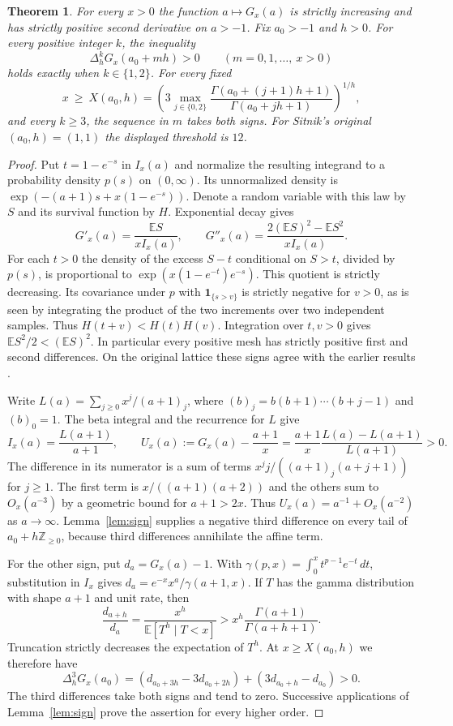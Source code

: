 \documentclass[11pt,a4paper]{article}
\newtheorem{theorem}{Theorem}[section]
\begin{document}
\begin{theorem}\label{thm:classification}
For every $x>0$ the function $a\mapsto G_x(a)$ is strictly increasing and
has strictly positive second derivative on $a>-1$. Fix $a_0>-1$ and $h>0$.
For every positive integer $k$, the inequality
\[
 \Delta_h^kG_x(a_0+mh)>0
 \qquad (m=0,1,\ldots,\ x>0)
\]
holds exactly when $k\in\{1,2\}$. For every fixed
\[
 x\ \ge\ X(a_0,h)=
 \left(3\max_{j\in\{0,2\}}
 \frac{\Gamma(a_0+(j+1)h+1)}{\Gamma(a_0+jh+1)}\right)^{1/h},
\]
and every $k\ge3$, the sequence in $m$ takes both signs.
For Sitnik's original $(a_0,h)=(1,1)$ the displayed threshold is $12$.
\end{theorem}
\begin{proof}
Put $t=1-e^{-s}$ in $I_x(a)$ and normalize the resulting integrand to a
probability density $p(s)$ on $(0,\infty)$. Its unnormalized density is
$\exp(-(a+1)s+x(1-e^{-s}))$. Denote a random variable with this law by
$S$ and its survival function by $H$. Exponential decay gives
\[
 G'_x(a)=\frac{\mathbb E S}{xI_x(a)},\qquad
 G''_x(a)=\frac{2(\mathbb E S)^2-\mathbb E S^2}{xI_x(a)}.
\]
For each $t>0$ the density of the excess $S-t$ conditional on $S>t$,
divided by $p(s)$, is proportional to $\exp(x(1-e^{-t})e^{-s})$.
This quotient is strictly decreasing. Its covariance under $p$ with
$\mathbf 1_{\{s>v\}}$ is strictly negative for $v>0$, as is seen by
integrating the product of the two increments over two independent samples.
Thus $H(t+v)<H(t)H(v)$. Integration over $t,v>0$ gives
$\mathbb E S^2/2<(\mathbb E S)^2$. In particular every positive mesh has
strictly positive first and second differences. On the original lattice these
signs agree with the earlier results \cite{sitnik,mehrez}.

Write $L(a)=\sum_{j\ge0}x^j/(a+1)_j$, where
$(b)_j=b(b+1)\cdots(b+j-1)$ and $(b)_0=1$.
The beta integral and the recurrence for $L$ give
\[
 I_x(a)=\frac{L(a+1)}{a+1},\qquad
 U_x(a):=G_x(a)-\frac{a+1}{x}
 =\frac{a+1}{x}\frac{L(a)-L(a+1)}{L(a+1)}>0.
\]
The difference in its numerator is a sum of terms
$x^j j/((a+1)_j(a+j+1))$ for $j\ge1$. The first term is
$x/((a+1)(a+2))$ and the others sum to $O_x(a^{-3})$ by a geometric bound
for $a+1>2x$. Thus $U_x(a)=a^{-1}+O_x(a^{-2})$ as $a\to\infty$.
Lemma~\ref{lem:sign} supplies a negative third difference on every tail
of $a_0+h\mathbb Z_{\ge0}$, because third differences annihilate the affine term.

For the other sign, put $d_a=G_x(a)-1$. With
$\gamma(p,x)=\int_0^x t^{p-1}e^{-t}\,dt$, substitution in $I_x$ gives
$d_a=e^{-x}x^a/\gamma(a+1,x)$.
If $T$ has the gamma distribution with shape $a+1$ and unit rate, then
\[
 \frac{d_{a+h}}{d_a}
 =\frac{x^h}{\mathbb E[T^h\mid T<x]}
 >x^h\frac{\Gamma(a+1)}{\Gamma(a+h+1)}.
\]
Truncation strictly decreases the expectation of $T^h$. At
$x\ge X(a_0,h)$ we therefore have
\[
 \Delta_h^3 G_x(a_0)
 =(d_{a_0+3h}-3d_{a_0+2h})+(3d_{a_0+h}-d_{a_0})>0 .
\]
The third differences take both signs and tend to zero. Successive applications
of Lemma~\ref{lem:sign} prove the assertion for every higher order.
\end{proof}
\end{document}
